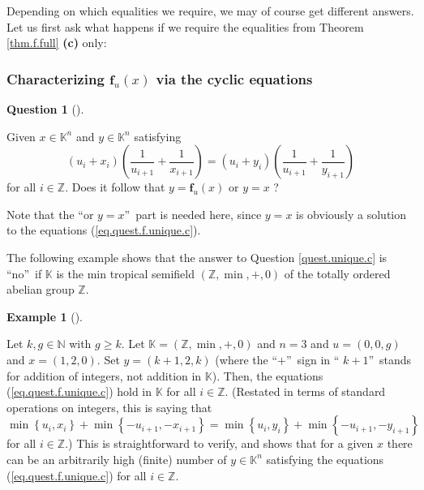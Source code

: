 \documentclass[numbers=enddot,12pt,final,onecolumn,notitlepage]{scrartcl}%
\theoremstyle{definition}
\newtheorem{quest}[theo]{Question}
\newenvironment{question}[1][]
{\begin{quest}[#1]\begin{leftbar}}
{\end{leftbar}\end{quest}}
\newtheorem{exam}[theo]{Example}
\newenvironment{example}[1][]
{\begin{exam}[#1]\begin{leftbar}}
{\end{leftbar}\end{exam}}
\newenvironment{question}[1][Question]{\noindent\textbf{#1.} }{\ \rule{0.5em}{0.5em}}
\begin{document}
Depending on which equalities we require, we may of course get different
answers. Let us first ask what happens if we require the equalities from
Theorem \ref{thm.f.full} \textbf{(c)} only:

\subsubsection{Characterizing $\mathbf{f}_{u}\left(  x\right)  $ via the
cyclic equations}

\begin{question}
\label{quest.unique.c}Given $x\in\mathbb{K}^{n}$ and $y\in\mathbb{K}^{n}$
satisfying
\begin{equation}
\left(  u_{i}+x_{i}\right)  \left(  \dfrac{1}{u_{i+1}}+\dfrac{1}{x_{i+1}%
}\right)  =\left(  u_{i}+y_{i}\right)  \left(  \dfrac{1}{u_{i+1}}+\dfrac
{1}{y_{i+1}}\right)  \label{eq.quest.f.unique.c}%
\end{equation}
for all $i\in\mathbb{Z}$. Does it follow that $y=\mathbf{f}_{u}\left(
x\right)  $ or $y=x$ ?
\end{question}

Note that the \textquotedblleft or $y=x$\textquotedblright\ part is needed
here, since $y=x$ is obviously a solution to the equations
(\ref{eq.quest.f.unique.c}).

The following example shows that the answer to Question \ref{quest.unique.c}
is \textquotedblleft no\textquotedblright\ if $\mathbb{K}$ is the min tropical
semifield $\left(  \mathbb{Z},\min,+,0\right)  $ of the totally ordered
abelian group $\mathbb{Z}$.

\begin{example}
\label{exa.unique.c.n=3-cex}Let $k,g\in\mathbb{N}$ with $g\geq k$. Let
$\mathbb{K}=\left(  \mathbb{Z},\min,+,0\right)  $ and $n=3$ and $u=\left(
0,0,g\right)  $ and $x=\left(  1,2,0\right)  $. Set $y=\left(  k+1,2,k\right)
$ (where the \textquotedblleft$+$\textquotedblright\ sign in \textquotedblleft%
$k+1$\textquotedblright\ stands for addition of integers, not addition in
$\mathbb{K}$). Then, the equations (\ref{eq.quest.f.unique.c}) hold in
$\mathbb{K}$ for all $i\in\mathbb{Z}$. (Restated in terms of standard
operations on integers, this is saying that%
\[
\min\left\{  u_{i},x_{i}\right\}  +\min\left\{  -u_{i+1},-x_{i+1}\right\}
=\min\left\{  u_{i},y_{i}\right\}  +\min\left\{  -u_{i+1},-y_{i+1}\right\}
\]
for all $i\in\mathbb{Z}$.) This is straightforward to verify, and shows that
for a given $x$ there can be an arbitrarily high (finite) number of
$y\in\mathbb{K}^{n}$ satisfying the equations (\ref{eq.quest.f.unique.c}) for
all $i\in\mathbb{Z}$.
\end{example}
\end{document}
